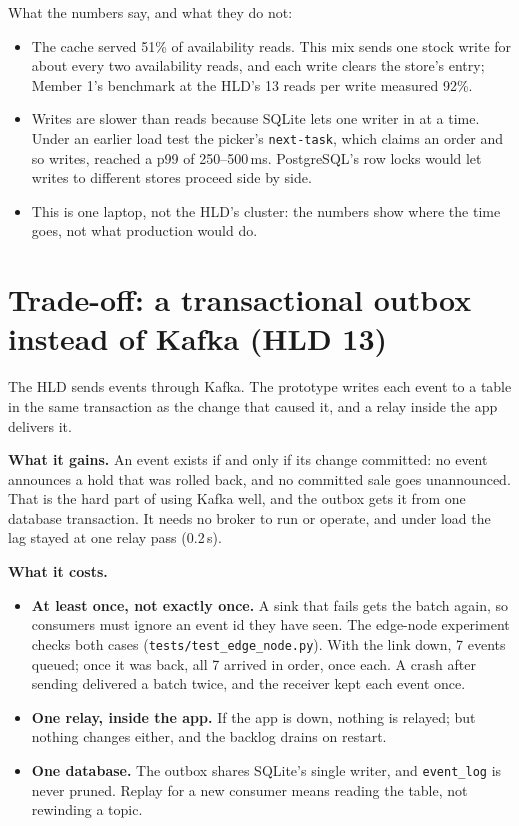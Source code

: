 What the numbers say, and what they do not:
\begin{itemize}
  \item The cache served 51\% of availability reads. This mix sends one stock write for about every two availability
    reads, and each write clears the store's entry; Member 1's benchmark at the HLD's 13 reads per write measured
    92\%.
  \item Writes are slower than reads because SQLite lets one writer in at a time. Under an earlier load test the
    picker's \texttt{next-task}, which claims an order and so writes, reached a p99 of 250--500\,ms. PostgreSQL's row
    locks would let writes to different stores proceed side by side.
  \item This is one laptop, not the HLD's cluster: the numbers show where the time goes, not what production would
    do.
\end{itemize}

\section{Trade-off: a transactional outbox instead of Kafka (HLD 13)}
\label{sec:m4-tradeoff}

The HLD sends events through Kafka. The prototype writes each event to a table in the same transaction as the change
that caused it, and a relay inside the app delivers it.

\textbf{What it gains.} An event exists if and only if its change committed: no event announces a hold that was
rolled back, and no committed sale goes unannounced. That is the hard part of using Kafka well, and the outbox gets
it from one database transaction. It needs no broker to run or operate, and under load the lag stayed at one relay
pass (0.2\,s).

\textbf{What it costs.}
\begin{itemize}
  \item \textbf{At least once, not exactly once.} A sink that fails gets the batch again, so consumers must ignore an
    event id they have seen. The edge-node experiment checks both cases (\texttt{tests/test\_edge\_node.py}). With
    the link down, 7 events queued; once it was back, all 7 arrived in order, once each. A crash after sending
    delivered a batch twice, and the receiver kept each event once.
  \item \textbf{One relay, inside the app.} If the app is down, nothing is relayed; but nothing changes either, and
    the backlog drains on restart.
  \item \textbf{One database.} The outbox shares SQLite's single writer, and \texttt{event\_log} is never pruned.
    Replay for a new consumer means reading the table, not rewinding a topic.
\end{itemize}

